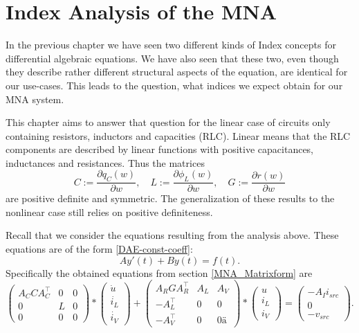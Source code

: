 \chapter{Index Analysis of the MNA}

\cite{ModellingAndDiscretizationOfCircuitProblems}

In the previous chapter we have seen two different kinds of Index concepts for differential algebraic equations. We have also seen that these two, even though they describe rather different structural aspects of the equation, are identical for our use-cases. This leads to the question, what indices we expect obtain for our MNA system.

This chapter aims to answer that question for the linear case of circuits only containing resistors, inductors and capacities (RLC). Linear means that the RLC components are described by linear functions with positive capacitances, inductances and resistances. Thus the matrices
\begin{displaymath}
	C:=\frac{\partial q_C(w)}{\partial w}, \quad L:=\frac{\partial \phi_L(w)}{\partial w}, \quad G:=\frac{\partial r(w)}{\partial w}
\end{displaymath}
are positive definite and symmetric. The generalization of these results to the nonlinear case still relies on positive definiteness.

Recall that we consider the equations resulting from the analysis above. These equations are of the form \eqref{DAE-const-coeff}:
\begin{displaymath}
	A y'(t) + B y(t) = f(t).
\end{displaymath}
Specifically the obtained equations from section \ref{MNA_Matrixform} are
\begin{displaymath}
	\begin{pmatrix}
		A_C C A_C^\top & 0 & 0 \\
		0 & L & 0 \\
		0 & 0 & 0
	\end{pmatrix}
	*
	\begin{pmatrix}
		\dot{u} \\
		\dot{i_L} \\
		\dot{i_V}
	\end{pmatrix}
	+
	\begin{pmatrix}
		A_R G A_R^\top & A_L & A_V \\
		-A_L^\top & 0 & 0 \\
		-A_V^\top & 0 & 0 ä
	\end{pmatrix}
	*
	\begin{pmatrix}
		u \\
		i_L \\
		i_V
	\end{pmatrix}
	=
	\begin{pmatrix}
		-A_I i_{src} \\
		0 \\
		-v_{src}
	\end{pmatrix}.
\end{displaymath}


